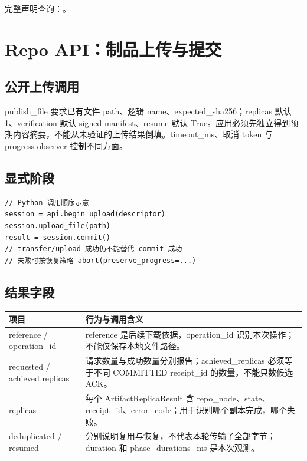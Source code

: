 完整声明查询：。

\section{Repo API：制品上传与提交}

\subsection{公开上传调用}
publish\_file 要求已有文件 path、逻辑 name、expected\_sha256；replicas 默认 1、verification 默认 signed-manifest、resume 默认 True。应用必须先独立得到预期内容摘要，不能从未验证的上传结果倒填。timeout\_ms、取消 token 与 progress observer 控制不同方面。

\subsection{显式阶段}

\begin{Verbatim}[fontsize=\footnotesize,breaklines,breakanywhere]
// Python 调用顺序示意
session = api.begin_upload(descriptor)
session.upload_file(path)
result = session.commit()
// transfer/upload 成功仍不能替代 commit 成功
// 失败时按恢复策略 abort(preserve_progress=...)
\end{Verbatim}

\subsection{结果字段}

\begin{longtable}{@{}p{43mm}p{119mm}@{}}
\toprule
项目 & 行为与调用含义 \\
\midrule\endhead
reference / operation\_id & reference 是后续下载依据，operation\_id 识别本次操作；不能仅保存本地文件路径。 \\
requested / achieved replicas & 请求数量与成功数量分别报告；achieved\_replicas 必须等于不同 COMMITTED receipt\_id 的数量，不能只数候选 ACK。 \\
replicas & 每个 ArtifactReplicaResult 含 repo\_node、state、receipt\_id、error\_code；用于识别哪个副本完成，哪个失败。 \\
deduplicated / resumed & 分别说明复用与恢复，不代表本轮传输了全部字节；duration 和 phase\_durations\_ms 是本次观测。 \\
\bottomrule
\end{longtable}

